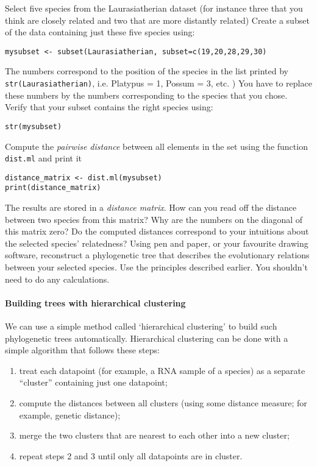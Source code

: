 \documentclass[a4paper, 9pt]{article}
\begin{document}
\begin{exercise}
    \action Select five species from the Laurasiatherian dataset (for instance three that you think are closely related and two that are more distantly related)
    \action Create a subset of the data containing just these five species using:\begin{lstlisting}
mysubset <- subset(Laurasiatherian, subset=c(19,20,28,29,30)
\end{lstlisting}
    The numbers correspond to the position of the species in the list printed by \texttt{str(Laurasiatherian)}, i.e. Platypus = 1, Possum = 3, etc. )
    You have to replace these numbers by the numbers corresponding to the species that you chose. 
    \action Verify that your subset contains the right species using:
\begin{lstlisting}
str(mysubset) 
\end{lstlisting}
    \action Compute the \textit{pairwise distance} between all elements in the set using the function \verb|dist.ml| and print it\begin{lstlisting}
distance_matrix <- dist.ml(mysubset)
print(distance_matrix)\end{lstlisting}
The results are stored in a \textit{distance matrix}. How can you read off the distance between two species from this matrix? Why are the numbers on the diagonal of this matrix zero?
    \action Do the computed distances correspond to your intuitions about the selected species' relatedness?
    \askstar Using pen and paper, or your favourite drawing software, reconstruct a phylogenetic tree that describes the evolutionary relations between your selected species. Use the principles described earlier. You shouldn't need to do any calculations. 
\end{exercise}


\paragraph{Building trees with hierarchical clustering}
We can use a simple method called `hierarchical clustering' to build
such phylogenetic trees automatically. Hierarchical clustering can be
done with a simple algorithm that follows these steps:

\begin{enumerate}
\item treat each datapoint (for example, a RNA sample of a species) as a separate ``cluster'' containing just one datapoint;
\item compute the distances between all clusters (using some distance measure; for example, genetic distance);
\item merge the two clusters that are nearest to each other into a new cluster;
\item repeat steps 2 and 3 until only all datapoints are in cluster. 
\end{enumerate}
\end{document}
